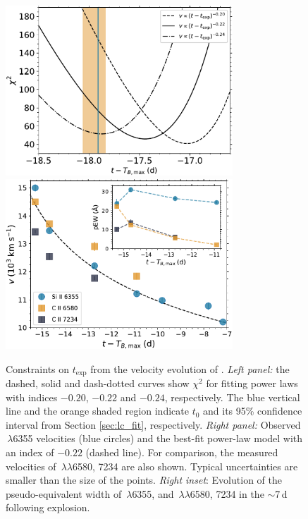 \documentclass[twocolumn]{aastex61}
\begin{document}
\begin{figure}[!thb]
  \centering
  \includegraphics[width=3.35in]{Chi2.pdf}
  \includegraphics[width=3.35in]{VelocityPlot.pdf}
  \caption{
  Constraints on $t_\mathrm{exp}$ from the velocity evolution of .
  \textit{Left panel:} the dashed, solid and dash-dotted curves show $\chi^2$
  for fitting power laws with indices $-0.20$, $-0.22$ and $-0.24$,
  respectively. The blue vertical line and the orange shaded region indicate
  $t_0$ and its 95\% confidence interval from Section \ref{sec:lc_fit},
  respectively. \textit{Right panel:} Observed \,$\lambda$6355
  velocities (blue circles) and the best-fit power-law model with an index of
  $-0.22$ (dashed line). For comparison, the measured velocities of
  \,$\lambda\lambda$6580, 7234 are also shown. Typical uncertainties
  are smaller than the size of the points. \textit{Right inset}: Evolution of
  the pseudo-equivalent width of \,$\lambda$6355, and
  \,$\lambda\lambda$6580, 7234 in the $\sim$7\,d following 
  explosion.}
  \label{fig:velocity_t_exp}
\end{figure}
\end{document}
